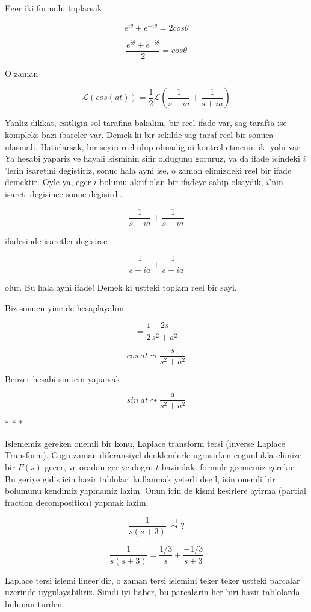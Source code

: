\documentclass[12pt,fleqn]{article}
\begin{document}
Eger iki formulu toplarsak

\[ e^{i\theta} + e^{-i\theta} = 2 cos\theta \]

\[ \frac{e^{i\theta} + e^{-i\theta}}{2} = cos\theta \]

O zaman 

\[ \mathcal{L}(cos(at)) = \frac{1}{2} \mathcal{L} 
(\frac{1}{s-ia} + \frac{1}{s+ia} )
\]

Yanliz dikkat, esitligin sol tarafina bakalim, bir reel ifade var, sag
tarafta ise kompleks bazi ibareler var. Demek ki bir sekilde sag taraf reel
bir sonuca ulasmali. Hatirlarsak, bir seyin reel olup olmadigini kontrol
etmenin iki yolu var. Ya hesabi yapariz ve hayali kisminin sifir oldugunu
goruruz, ya da ifade icindeki $i$'lerin isaretini degistiriz, sonuc hala
ayni ise, o zaman elimizdeki reel bir ifade demektir. Oyle ya, eger $i$
bolumu aktif olan bir ifadeye sahip olsaydik, $i$'nin isareti degisince
sonuc degisirdi. 

\[ \frac{1}{s-ia} + \frac{1}{s+ia} \]

ifadesinde isaretler degisirse 

\[ \frac{1}{s+ia} + \frac{1}{s-ia} \]

olur. Bu hala ayni ifade! Demek ki ustteki toplam reel bir sayi. 

Biz sonucu yine de hesaplayalim

\[ = \frac{1}{2}\frac{2s}{s^2+a^2} \]

\[ cos \ at \leadsto \frac{s}{s^2+a^2} \]

Benzer hesabi sin icin yaparsak 

\[ sin \ at \leadsto \frac{a}{s^2 + a^2} \]


* * * 

Islememiz gereken onemli bir konu, Laplace transform tersi (inverse Laplace
Transform). Cogu zaman diferansiyel denklemlerle ugrasirken cogunlukla
elimize bir $F(s)$ gecer, ve oradan geriye dogru $t$ bazindaki formule
gecmemiz gerekir. Bu geriye gidis icin hazir tablolari kullanmak yeterli
degil, isin onemli bir bolumunu kendimiz yapmamiz lazim. Onun icin de kismi
kesirlere ayirma (partial fraction decomposition) yapmak lazim.  

\[ \frac{1}{s(s+3)} \  \stackrel{-1}{\leadsto} ? \]


\[ \frac{1}{s(s+3)} = 
\frac{1/3}{s} + \frac{-1/3}{s+3}
\]

Laplace tersi islemi lineer'dir, o zaman tersi islemini teker teker ustteki
parcalar uzerinde uygulayabiliriz. Simdi iyi haber, bu parcalarin her biri
hazir tablolarda bulunan turden. 
\end{document}
